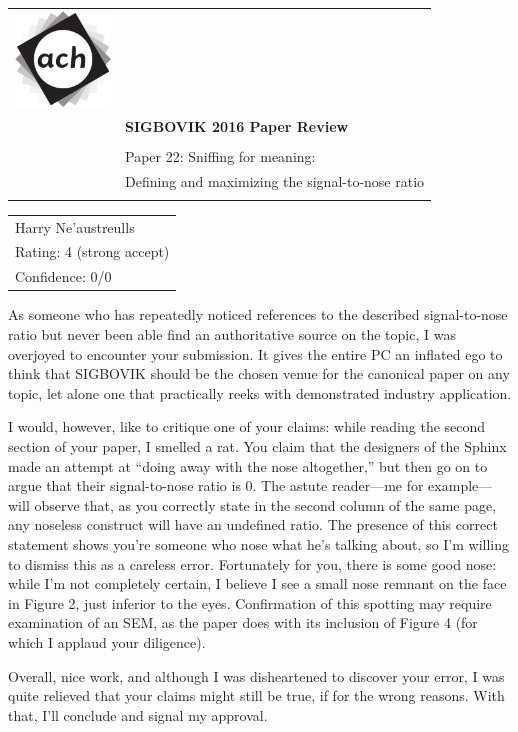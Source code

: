 \documentclass[12pt]{article}
\begin{document}
{\sffamily
\begin{tabular}{ll}
\includegraphics[width=1in]{ach.png}\\
& \textbf{\Huge{SIGBOVIK 2016 Paper Review}} \\ &\\
& \LARGE{Paper 22: Sniffing for meaning:} \\
& \LARGE{Defining and maximizing the signal-to-nose ratio} \\
&\\
\hline
\end{tabular}}
\vspace{2em}

{\large\bf
\begin{tabular}{l}
Harry Ne'austreulls \\
Rating: 4 (strong accept) \\
Confidence: 0/0 \\
\end{tabular}}
\vspace{1em}

As someone who has repeatedly noticed references to the described signal-to-nose ratio but never
been able find an authoritative source on the topic, I was overjoyed to encounter your submission.
It gives the entire PC an inflated ego to think that SIGBOVIK should be the chosen venue for the
canonical paper on any topic, let alone one that practically reeks with demonstrated industry
application.

I would, however, like to critique one of your claims: while reading the second section of your
paper, I smelled a rat.
You claim that the designers of the Sphinx made an attempt at ``doing away with the nose
altogether,'' but then go on to argue that their signal-to-nose ratio is 0.
The astute reader---me for example---will observe that, as you correctly state in the second column
of the same page, any noseless construct will have an undefined ratio.
The presence of this correct statement shows you're someone who nose what he's talking about, so I'm
willing to dismiss this as a careless error.
Fortunately for you, there is some good nose: while I'm not completely certain, I believe I see a
small nose remnant on the face in Figure 2, just inferior to the eyes.
Confirmation of this spotting may require examination of an SEM, as the paper does with its
inclusion of Figure 4 (for which I applaud your diligence).

Overall, nice work, and although I was disheartened to discover your error, I was quite relieved
that your claims might still be true, if for the wrong reasons.
With that, I'll conclude and signal my approval.
\end{document}
